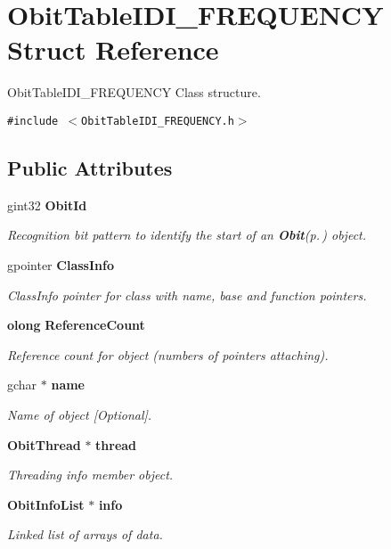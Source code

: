 \section{Obit\-Table\-IDI\_\-FREQUENCY Struct Reference}
\label{structObitTableIDI__FREQUENCY}
Obit\-Table\-IDI\_\-FREQUENCY Class structure.  


{\tt \#include $<$Obit\-Table\-IDI\_\-FREQUENCY.h$>$}

\subsection*{Public Attributes}
\begin{CompactItemize}
\item 
gint32 {\bf Obit\-Id}
\begin{CompactList}\small\item\em Recognition bit pattern to identify the start of an {\bf Obit}{\rm (p.\,\pageref{structObit})} object. \item\end{CompactList}\item 
gpointer {\bf Class\-Info}
\begin{CompactList}\small\item\em Class\-Info pointer for class with name, base and function pointers. \item\end{CompactList}\item 
{\bf olong} {\bf Reference\-Count}
\begin{CompactList}\small\item\em Reference count for object (numbers of pointers attaching). \item\end{CompactList}\item 
gchar $\ast$ {\bf name}
\begin{CompactList}\small\item\em Name of object [Optional]. \item\end{CompactList}\item 
{\bf Obit\-Thread} $\ast$ {\bf thread}
\begin{CompactList}\small\item\em Threading info member object. \item\end{CompactList}\item 
{\bf Obit\-Info\-List} $\ast$ {\bf info}
\begin{CompactList}\small\item\em Linked list of arrays of data. \item\end{CompactList}\item 

\end{CompactItemize}
